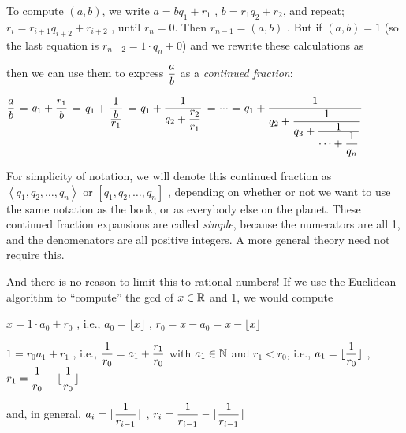 \ssk

To compute $(a,b)$, we write $a=bq_1+r_1$ , $b=r_1q_2+r_2$, and repeat; $r_i=r_{i+1}q_{i+2}+r_{i+2}$ , 
until $r_n=0$. Then $r_{n-1}=(a,b)$ . But if $(a,b)=1$ (so the last equation is $r_{n-2} = 1\cdot q_n+0$) and
we rewrite these calculations as


then we can use them to express $\displaystyle {{a}\over{b}}$ as a {\it continued fraction}:

\ssk

$\displaystyle {{a}\over{b}}$ = 
$\displaystyle q_1+{\displaystyle {r_1}\over{b}}$ = 
$\displaystyle q_1+{\displaystyle {1}\over{\displaystyle {b}\over{\displaystyle r_1}}}$ = 
$\displaystyle q_1+{\displaystyle {1}\over{\displaystyle q_2+{\displaystyle {r_2}\over{\displaystyle r_1}}}}$ = 
$\cdots$ = 
$\displaystyle q_1+{\displaystyle {1}\over{\displaystyle q_2+{\displaystyle {1}\over{q_3+{\displaystyle {1}\over{\displaystyle \cdots + {\displaystyle {1}\over{\displaystyle q_n}}}}}}}}$ 

\msk

For simplicity of notation, we will denote this continued fraction as $\left< q_1,q_2,\ldots, q_n\right>$ or $[q_1,q_2,\ldots, q_n]$ ,
depending on whether or not we want to use the same notation as the book, or as everybody else on the planet.
These continued fraction expansions are called {\it simple}, because the numerators are all 1, and the denomenators
are all positive integers. A more general theory need not require this.

\ssk

And there is no reason to limit this to rational numbers! If we use the Euclidean algorithm to ``compute''
the gcd of $x\in {\Bbb R}$ and 1, we would compute

\ssk

$x=1\cdot a_0 +r_0$ , i.e., $a_0=\lfloor x\rfloor$ , $r_0=x-a_0 = x-\lfloor x\rfloor$

$1=r_0a_1 + r_1$ , i.e., $\displaystyle {{1}\over{r_0}} = a_1 + {{r_1}\over{r_0}}$ 
with $a_1\in{\Bbb N}$ and $r_1<r_0$, i.e., 
$\displaystyle a_1 = \lfloor{{1}\over{r_0}}\rfloor$ , $\displaystyle r_1 = {{1}\over{r_0}} - \lfloor{{1}\over{r_0}}\rfloor$

and, in general, $\displaystyle a_i = \lfloor{{1}\over{r_{i-1}}}\rfloor$ , $\displaystyle r_i = {{1}\over{r_{i-1}}} - \lfloor{{1}\over{r_{i-1}}}\rfloor$

